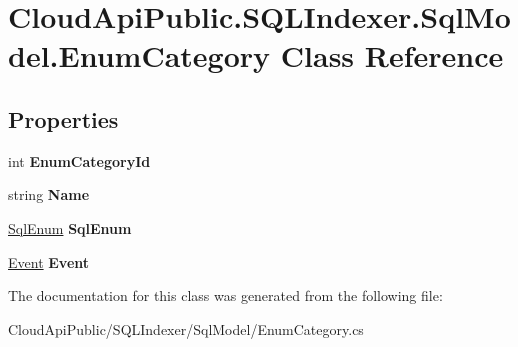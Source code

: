\hypertarget{class_cloud_api_public_1_1_s_q_l_indexer_1_1_sql_model_1_1_enum_category}{\section{Cloud\-Api\-Public.\-S\-Q\-L\-Indexer.\-Sql\-Model.\-Enum\-Category Class Reference}
\label{class_cloud_api_public_1_1_s_q_l_indexer_1_1_sql_model_1_1_enum_category}
}
\subsection*{Properties}
\begin{DoxyCompactItemize}
\item 
\hypertarget{class_cloud_api_public_1_1_s_q_l_indexer_1_1_sql_model_1_1_enum_category_aec63a850d33ba76e9e25f1cecdeaf60b}{int {\bfseries Enum\-Category\-Id}}\label{class_cloud_api_public_1_1_s_q_l_indexer_1_1_sql_model_1_1_enum_category_aec63a850d33ba76e9e25f1cecdeaf60b}

\item 
\hypertarget{class_cloud_api_public_1_1_s_q_l_indexer_1_1_sql_model_1_1_enum_category_a4535e8c3105c78f8e70d22030cd62428}{string {\bfseries Name}}\label{class_cloud_api_public_1_1_s_q_l_indexer_1_1_sql_model_1_1_enum_category_a4535e8c3105c78f8e70d22030cd62428}

\item 
\hypertarget{class_cloud_api_public_1_1_s_q_l_indexer_1_1_sql_model_1_1_enum_category_aa4dbec44443c23c7bb363b74236ffb81}{\hyperlink{class_cloud_api_public_1_1_s_q_l_indexer_1_1_sql_model_1_1_sql_enum}{Sql\-Enum} {\bfseries Sql\-Enum}}\label{class_cloud_api_public_1_1_s_q_l_indexer_1_1_sql_model_1_1_enum_category_aa4dbec44443c23c7bb363b74236ffb81}

\item 
\hypertarget{class_cloud_api_public_1_1_s_q_l_indexer_1_1_sql_model_1_1_enum_category_a19061964109fc49b98b57532bda31645}{\hyperlink{class_cloud_api_public_1_1_s_q_l_indexer_1_1_sql_model_1_1_event}{Event} {\bfseries Event}}\label{class_cloud_api_public_1_1_s_q_l_indexer_1_1_sql_model_1_1_enum_category_a19061964109fc49b98b57532bda31645}

\end{DoxyCompactItemize}


The documentation for this class was generated from the following file\-:\begin{DoxyCompactItemize}
\item 
Cloud\-Api\-Public/\-S\-Q\-L\-Indexer/\-Sql\-Model/Enum\-Category.\-cs\end{DoxyCompactItemize}
